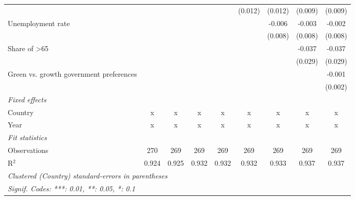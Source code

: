 \begin{table}[htbp]
\begin{tabular}{lcccccccc}
                                                      &         &         &                &                & (0.012)        & (0.012)        & (0.009)        & (0.009)\\   
      Unemployment rate                               &         &         &                &                &                & -0.006         & -0.003         & -0.002\\   
                                                      &         &         &                &                &                & (0.008)        & (0.008)        & (0.008)\\   
      Share of >65                                    &         &         &                &                &                &                & -0.037         & -0.037\\   
                                                      &         &         &                &                &                &                & (0.029)        & (0.029)\\   
      Green vs. growth government preferences         &         &         &                &                &                &                &                & -0.001\\   
                                                      &         &         &                &                &                &                &                & (0.002)\\   
      \emph{Fixed effects}\\
      Country                                         & x       & x       & x              & x              & x              & x              & x              & x\\  
      Year                                            & x       & x       & x              & x              & x              & x              & x              & x\\  
      \midrule \emph{Fit statistics}\\
      Observations                                    & 270     & 269     & 269            & 269            & 269            & 269            & 269            & 269\\  
      R$^2$                                           & 0.924   & 0.925   & 0.932          & 0.932          & 0.932          & 0.933          & 0.937          & 0.937\\  
      \midrule
      \multicolumn{9}{l}{\emph{Clustered (Country) standard-errors in parentheses}}\\
      \multicolumn{9}{l}{\emph{Signif. Codes: ***: 0.01, **: 0.05, *: 0.1}}\\
   \end{tabular}
\end{table}


